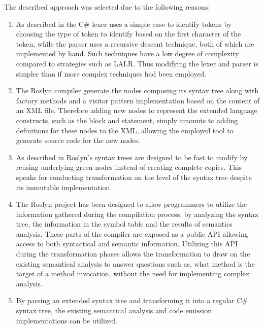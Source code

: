 The described approach was selected due to the following reasons:
\begin{enumerate}
\item As described in  the C\# lexer  uses a simple  case to identify tokens by choosing the type of token to identify based on the first character of the token, while the parser uses a recursive descent technique, both of which are implemented by hand. Such techniques have a low degree of complexity compared to strategies such as \ac{LALR}. Thus modifying the lexer and parser is simpler than if more complex techniques had been employed.

\item The Roslyn compiler generate the nodes composing its syntax tree along with factory methods and a visitor pattern implementation based on the content of an \ac{XML} file. Therefore adding new nodes to represent the extended language constructs, such as the  block and  statement, simply amounts to adding definitions for these nodes to the \ac{XML}, allowing the employed tool to generate source code for the new nodes. 

\item As described in  Roslyn's syntax trees are designed to be fast to modify by reusing underlying green nodes instead of creating complete copies\cite[p. 6]{ng2012roslyn}. This speaks for conducting transformation on the level of the syntax tree despite its immutable implementation.

\item The Roslyn project has been designed to allow programmers to utilize the information gathered during the compilation process, by analyzing the syntax tree, the information in the symbol table and the results of semantics analysis. These parts of the compiler are exposed as a public \ac{API} allowing access to both syntactical and semantic information. Utilizing this \ac{API} during the transformation phases allows the transformation to draw on the existing semantical analysis to answer questions such as, what method is the target of a method invocation, without the need for implementing complex analysis.

\item By parsing an extended syntax tree and transforming it into a regular C\# syntax tree, the existing semantical analysis and code emission implementations can be utilized.
\end{enumerate}
